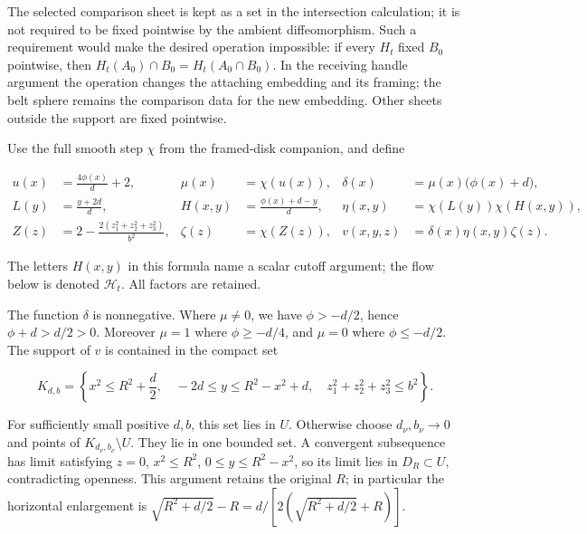 The selected comparison sheet is kept as a set in the intersection calculation; it is not required to be fixed pointwise by the ambient diffeomorphism. Such a requirement would make the desired operation impossible: if every \(H_t\) fixed \(B_0\) pointwise, then \(H_t(A_0)\cap B_0=H_t(A_0\cap B_0)\). In the receiving handle argument the operation changes the attaching embedding and its framing; the belt sphere remains the comparison data for the new embedding. Other sheets outside the support are fixed pointwise.

Use the full smooth step \(\chi\) from the framed-disk companion, and define

\begin{equation}
\begin{aligned}
u(x)&=\frac{4\phi(x)}d+2,&
\mu(x)&=\chi(u(x)),&
\delta(x)&=\mu(x)\bigl(\phi(x)+d\bigr),\\
L(y)&=\frac{y+2d}{d},&
H(x,y)&=\frac{\phi(x)+d-y}{d},&
\eta(x,y)&=\chi(L(y))\chi(H(x,y)),\\
Z(z)&=2-\frac{2(z_1^2+z_2^2+z_3^2)}{b^2},&
\zeta(z)&=\chi(Z(z)),&
v(x,y,z)&=\delta(x)\eta(x,y)\zeta(z).
\end{aligned}
\label{courseIII:whitney-move-with-controlled-support:eq:1.3}
\end{equation}

The letters \(H(x,y)\) in this formula name a scalar cutoff argument; the flow below is denoted \(\mathcal H_t\). All factors are retained.

The function \(\delta\) is nonnegative. Where \(\mu\ne0\), we have \(\phi>-d/2\), hence \(\phi+d>d/2>0\). Moreover \(\mu=1\) where \(\phi\geq-d/4\), and \(\mu=0\) where \(\phi\leq-d/2\). The support of \(v\) is contained in the compact set

\begin{equation}
K_{d,b}=
\left\{x^2\leq R^2+\frac d2,\quad
 -2d\leq y\leq R^2-x^2+d,\quad
 z_1^2+z_2^2+z_3^2\leq b^2\right\}.
\label{courseIII:whitney-move-with-controlled-support:eq:1.4}
\end{equation}

For sufficiently small positive \(d,b\), this set lies in \(U\). Otherwise choose \(d_\nu,b_\nu\to0\) and points of \(K_{d_\nu,b_\nu}\setminus U\). They lie in one bounded set. A convergent subsequence has limit satisfying \(z=0\), \(x^2\leq R^2\), \(0\leq y\leq R^2-x^2\), so its limit lies in \(D_R\subset U\), contradicting openness. This argument retains the original \(R\); in particular the horizontal enlargement is
\(\sqrt{R^2+d/2}-R=d/[2(\sqrt{R^2+d/2}+R)]\).

